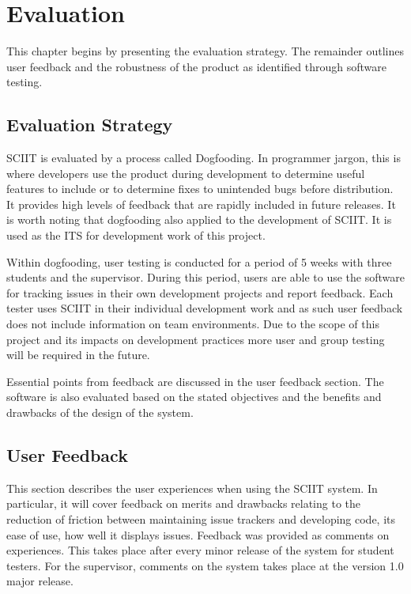\documentclass{mproj}
\begin{document}
\chapter{Evaluation}\label{evaluation}

This chapter begins by presenting the evaluation strategy. The remainder outlines user feedback and the robustness of the product as identified through software testing. 

\section{Evaluation Strategy}

SCIIT is evaluated by a process called Dogfooding. In programmer jargon, this is where developers use the product during development to determine useful features to include or to determine fixes to unintended bugs before distribution. It provides high levels of feedback that are rapidly included in future releases. It is worth noting that dogfooding also applied to the development of SCIIT. It is used as the ITS for development work of this project.

Within dogfooding, user testing is conducted for a period of 5 weeks with three students and the supervisor. During this period, users are able to use the software for tracking issues in their own development projects and report feedback. Each tester uses SCIIT in their individual development work and as such user feedback does not include information on team environments. Due to the scope of this project and its impacts on development practices more user and group testing will be required in the future. 

Essential points from feedback are discussed in the user feedback section. The software is also evaluated based on the stated objectives and the benefits and drawbacks of the design of the system.


\section{User Feedback}

This section describes the user experiences when using the SCIIT system. In particular, it will cover feedback on merits and drawbacks relating to the reduction of friction between maintaining issue trackers and developing code, its ease of use, how well it displays issues. Feedback was provided as comments on experiences. This takes place after every minor release of the system for student testers. For the supervisor, comments on the system takes place at the version 1.0 major release.
\end{document}
